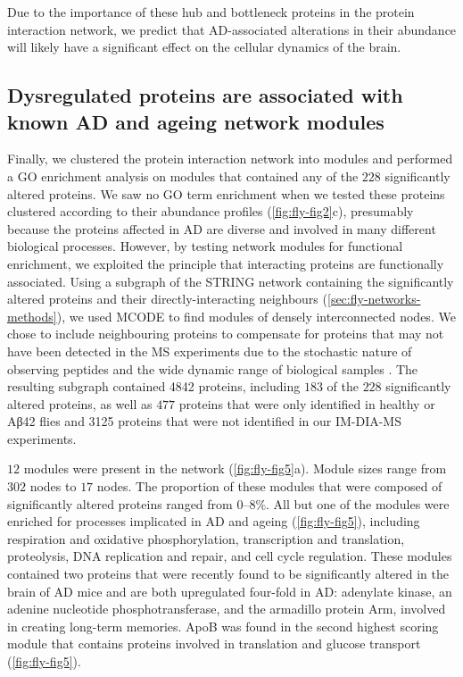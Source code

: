 Due to the importance of these hub and bottleneck proteins in the protein interaction network,
we predict that AD-associated alterations in their abundance will likely have a
significant effect on the cellular dynamics of the brain.

\subsection{Dysregulated proteins are associated with known AD and ageing network modules}

Finally, we clustered the protein interaction network into modules and performed a
GO enrichment analysis on modules that contained any of the
$228$ significantly altered proteins.
We saw no GO term enrichment when we tested these proteins clustered
according to their abundance profiles (\ref{fig:fly-fig2}c),
presumably because the proteins affected in AD are diverse and involved in many
different biological processes.
However, by testing network modules for functional enrichment,
we exploited the principle that interacting proteins are functionally associated.
Using a subgraph of the STRING network containing the significantly altered proteins
and their directly-interacting neighbours (\ref{sec:fly-networks-methods}),
we used MCODE \cite{Bader2003} to find modules of densely interconnected nodes.
We chose to include neighbouring proteins to compensate for proteins that may not
have been detected in the MS experiments due to the stochastic nature of observing
peptides and the wide dynamic range of biological samples \cite{Lazar2016a}.
The resulting subgraph contained \num{4842} proteins,
including $183$ of the $228$ significantly altered proteins,
as well as $477$ proteins that were only identified in healthy or Aβ42 flies
and \num{3125} proteins that were not identified in our IM-DIA-MS experiments.

$12$ modules were present in the network (\ref{fig:fly-fig5}a).
Module sizes range from $302$ nodes to $17$ nodes.
The proportion of these modules that were composed of significantly altered proteins
ranged from \numrange{0}{8}$\%$.
All but one of the modules were enriched for processes implicated in AD and ageing
(\ref{fig:fly-fig5}), including respiration and
oxidative phosphorylation, transcription and translation, proteolysis,
DNA replication and repair, and cell cycle regulation.
These modules contained two proteins that were recently found to be significantly altered
in the brain of AD mice \cite{Savas2017} and are both upregulated four-fold in AD:
adenylate kinase, an adenine nucleotide phosphotransferase, and the armadillo protein Arm,
involved in creating long-term memories.
ApoB was found in the second highest scoring module that contains proteins involved
in translation and glucose transport \cite{Niccoli2016} (\ref{fig:fly-fig5}).

